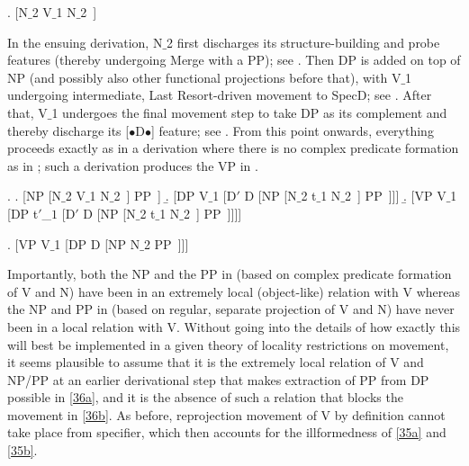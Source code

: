 \documentclass[output=paper
,modfonts
,nonflat]{langsci/langscibook}
\begin{document}
\Lsciexi. [N$\_$2 V$\_$1 N$\_$2~]

In the ensuing derivation, N$\_$2 first discharges its structure-building
and probe features (thereby undergoing Merge with a PP); see \Next[a].
Then
DP is added on top of NP (and possibly also other functional projections
before that), with V$\_$1 undergoing intermediate, Last Resort-driven
movement to SpecD; see \Next[a]. After that, V$\_$1 undergoes the
final  movement step to take DP as its complement and thereby
discharge its [{\small $\bullet$}D{\small $\bullet$}] feature; see
\Next[b]. From this point onwards, everything proceeds exactly as in
a derivation where there is no complex predicate formation as in
\Next; such a derivation produces the VP in \NNext. 

\Lsciexi.
\a. [NP [N$\_$2 V$\_$1 N$\_$2~] PP~]
\b. [DP V$\_$1 [D$'$ D [NP [N$\_$2 t$\_$1 N$\_$2~] PP~]]]
\b. [VP V$\_$1 [DP t$'$\_$1$ [D$'$ D [NP [N$\_$2 t$\_$1 N$\_$2~] PP~]]]]

\Lsciexi. [VP V$\_$1 [DP D [NP N$\_$2 PP~]]]

Importantly, both the NP and the PP in \LLast[c] (based on complex
predicate formation of V and N) have been in an extremely local
(object-like) relation with V whereas the NP and PP in \Last (based
on regular, separate projection of V and N) have never been in a local
relation with V. Without going into the details of how exactly this
will best be implemented in a given theory of locality restrictions on movement, it
seems plausible to assume that it is the extremely local relation of V
and NP/PP at an earlier derivational step that makes extraction of PP
from DP possible in  \ref{36a}, and it is the absence of such a relation that blocks
the movement in \ref{36b}. As before, reprojection movement of V
by definition cannot take place from specifier, which then accounts
for the illformedness of \ref{35a} and \ref{35b}.
\end{document}
